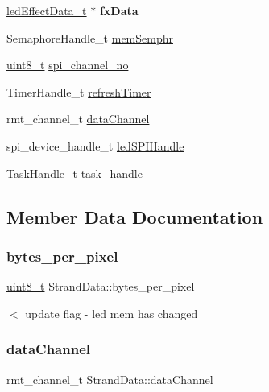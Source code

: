 \begin{DoxyCompactItemize}
\hyperlink{structledEffectData}{led\+Effect\+Data\+\_\+t} $\ast$ {\bfseries fx\+Data}
\item 
Semaphore\+Handle\+\_\+t \hyperlink{structStrandData_aedec356f21caa5f3c3ec6c3615f90aff}{mem\+Semphr}
\item 
\hyperlink{vl53l0x__types_8h_aba7bc1797add20fe3efdf37ced1182c5}{uint8\+\_\+t} \hyperlink{structStrandData_ab6b3cfdc586b5a40497eb3d2931af76e}{spi\+\_\+channel\+\_\+no}
\item 
Timer\+Handle\+\_\+t \hyperlink{structStrandData_a68042468cd5f01417cb5f971feab4293}{refresh\+Timer}
\item 
rmt\+\_\+channel\+\_\+t \hyperlink{structStrandData_a50460c636123d0913362d3eab09f4b3f}{data\+Channel}
\item 
spi\+\_\+device\+\_\+handle\+\_\+t \hyperlink{structStrandData_aea9c3c5f3d3678e92723c7d2264b4f9e}{led\+S\+P\+I\+Handle}
\item 
Task\+Handle\+\_\+t \hyperlink{structStrandData_a0fbcfc7622e746b01484b7b943ffa913}{task\+\_\+handle}
\end{DoxyCompactItemize}


\subsection{Member Data Documentation}
\mbox{\label{structStrandData_a627df352791351af4c92b6249608c58f}} 
\subsubsection{\texorpdfstring{bytes\+\_\+per\+\_\+pixel}{bytes\_per\_pixel}}
{\footnotesize\ttfamily \hyperlink{vl53l0x__types_8h_aba7bc1797add20fe3efdf37ced1182c5}{uint8\+\_\+t} Strand\+Data\+::bytes\+\_\+per\+\_\+pixel}

$<$ update flag -\/ led mem has changed \mbox{\label{structStrandData_a50460c636123d0913362d3eab09f4b3f}} 
\subsubsection{\texorpdfstring{data\+Channel}{dataChannel}}
{\footnotesize\ttfamily rmt\+\_\+channel\+\_\+t Strand\+Data\+::data\+Channel}

